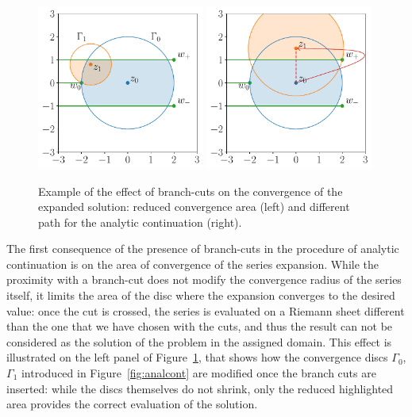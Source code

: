 \begin{figure}[t]
\includegraphics[width=0.49\textwidth]{Images/cuts_and_convergence.pdf}
\includegraphics[width=0.49\textwidth]{Images/cuts_and_paths.pdf}
\caption{\label{fig:cuts}
 Example of the effect of branch-cuts on the convergence of the expanded solution: reduced convergence area (left) and different path for the analytic continuation (right).}
\end{figure}

The first consequence of the presence of branch-cuts in the procedure of analytic continuation is on the area of convergence of the series expansion.
While the proximity with a branch-cut does not modify the convergence radius of the series itself, it limits the area of the disc where the expansion converges to the desired value: 
once the cut is crossed, the series is evaluated on a Riemann sheet different than the one that we have chosen with the cuts, and thus the result can not be considered as the solution of the problem in the assigned domain.
This effect is illustrated on the left panel of Figure~\ref{fig:cuts}, that shows how the convergence discs $\Gamma_0$, $\Gamma_1$ introduced in Figure~\ref{fig:analcont} are modified once the branch cuts are inserted: while the discs themselves do not shrink, only the reduced highlighted area provides the correct evaluation of the solution.


